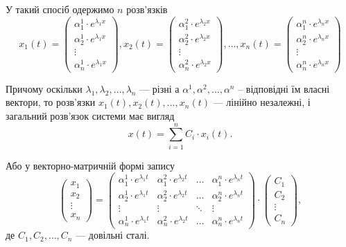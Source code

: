 \begin{enumerate}
У такий спосіб одержимо $n$ розв'язків
\begin{equation*}
	x_1(t) = \begin{pmatrix} \alpha_1^1 \cdot e^{\lambda_1 x} \\ \alpha_2^1 \cdot e^{\lambda_1 x} \\ \vdots \\ \alpha_n^1 \cdot e^{\lambda_1 x} \end{pmatrix}, 
	x_2(t) = \begin{pmatrix} \alpha_1^2 \cdot e^{\lambda_2 x} \\ \alpha_2^2 \cdot e^{\lambda_2 x} \\ \vdots \\ \alpha_n^2 \cdot e^{\lambda_2 x} \end{pmatrix},
	\ldots, 
	x_n(t) = \begin{pmatrix} \alpha_1^n \cdot e^{\lambda_n x} \\ \alpha_2^n \cdot e^{\lambda_n x} \\ \vdots \\ \alpha_n^n \cdot e^{\lambda_n x} \end{pmatrix}
\end{equation*}

Причому оскільки $\lambda_1, \lambda_2, \ldots, \lambda_n$ --- різні а $\alpha^1, \alpha^2, \ldots, \alpha^n$ -- відповідні їм власні вектори, то розв'язки $x_1(t), x_2(t), \ldots, x_n(t)$ --- лінійно незалежні, і загальний розв'язок системи має вигляд
\begin{equation*}
	x(t) = \sum_{i = 1}^n C_i \cdot x_i(t).
\end{equation*}

Або у векторно-матричній формі запису
\begin{equation*}
	\begin{pmatrix} x_1 \\ x_2 \\ \vdots \\ x_n \end{pmatrix} = 
	\begin{pmatrix}
		\alpha_1^1 \cdot e^{\lambda_1 t} & \alpha_1^2 \cdot e^{\lambda_2 t} & \ldots & \alpha_1^n \cdot e^{\lambda_n t} \\
		\alpha_2^1 \cdot e^{\lambda_1 t} & \alpha_2^2 \cdot e^{\lambda_2 t} & \ldots & \alpha_2^n \cdot e^{\lambda_n t} \\
		\vdots & \vdots & \ddots & \vdots \\
		\alpha_n^1 \cdot e^{\lambda_1 t} & \alpha_n^2 \cdot e^{\lambda_2 t} & \ldots & \alpha_n^n \cdot e^{\lambda_n t}
	\end{pmatrix}
	\cdot
	\begin{pmatrix} C_1 \\ C_2 \\ \vdots \\ C_n \end{pmatrix},
\end{equation*}
де $C_1, C_2, \ldots, C_n$ --- довільні сталі.


\end{enumerate}

